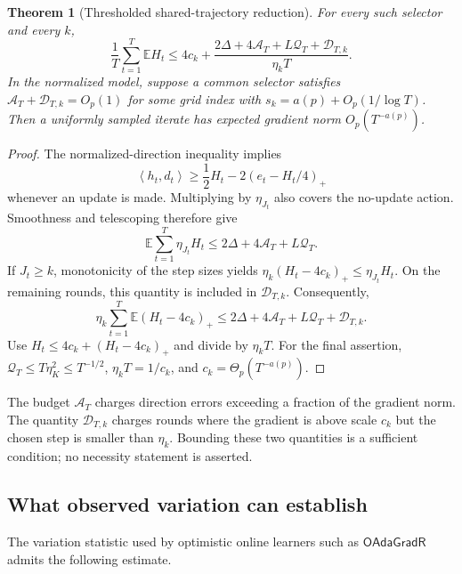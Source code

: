\documentclass[11pt,a4paper]{article}
\newcommand{\E}{\mathbb{E}}
\newcommand{\inner}[2]{\left\langle #1,#2\right\rangle}
\newtheorem{theorem}{Theorem}[section]
\theoremstyle{definition}
\theoremstyle{remark}
\begin{document}
\begin{theorem}[Thresholded shared-trajectory reduction]\label{thm:thresholded-reduction}
For every such selector and every $k$,
\begin{equation}\label{eq:thresholded-reduction}
 \frac1T\sum_{t=1}^T\E H_t
 \le4c_k+
 \frac{2\Delta+4\mathcal A_T+L\mathcal Q_T+\mathcal D_{T,k}}
 {\eta_kT}.
\end{equation}
In the normalized model, suppose a common selector satisfies
$\mathcal A_T+\mathcal D_{T,k}=O_p(1)$ for some grid index with
$s_k=a(p)+O_p(1/\log T)$.
Then a uniformly sampled iterate has expected gradient norm
$O_p(T^{-a(p)})$.
\end{theorem}
\begin{proof}
The normalized-direction inequality implies
\[
 \inner{h_t}{d_t}
 \ge\frac12H_t-2(e_t-H_t/4)_+
\]
whenever an update is made. Multiplying by $\eta_{J_t}$ also covers
the no-update action. Smoothness and telescoping therefore give
\begin{equation}\label{eq:weighted-descent}
 \E\sum_{t=1}^T\eta_{J_t}H_t
 \le2\Delta+4\mathcal A_T+L\mathcal Q_T.
\end{equation}
If $J_t\ge k$, monotonicity of the step sizes yields
$\eta_k(H_t-4c_k)_+\le\eta_{J_t}H_t$.
On the remaining rounds, this quantity is included in
$\mathcal D_{T,k}$. Consequently,
\[
 \eta_k\sum_{t=1}^T\E(H_t-4c_k)_+
 \le2\Delta+4\mathcal A_T+L\mathcal Q_T+\mathcal D_{T,k}.
\]
Use $H_t\le4c_k+(H_t-4c_k)_+$ and divide by $\eta_kT$.
For the final assertion,
$\mathcal Q_T\le T\eta_K^2\le T^{-1/2}$,
$\eta_kT=1/c_k$, and $c_k=\Theta_p(T^{-a(p)})$.
\end{proof}

The budget $\mathcal A_T$ charges direction errors exceeding a fraction
of the gradient norm. The quantity $\mathcal D_{T,k}$ charges rounds
where the gradient is above scale $c_k$ but the chosen step is smaller
than $\eta_k$. Bounding these two quantities is a sufficient condition;
no necessity statement is asserted.

\subsection{What observed variation can establish}

The variation statistic used by optimistic online learners such as
$\mathsf{OAdaGradR}$ \cite{liu2026oco} admits the following estimate.
\end{document}
